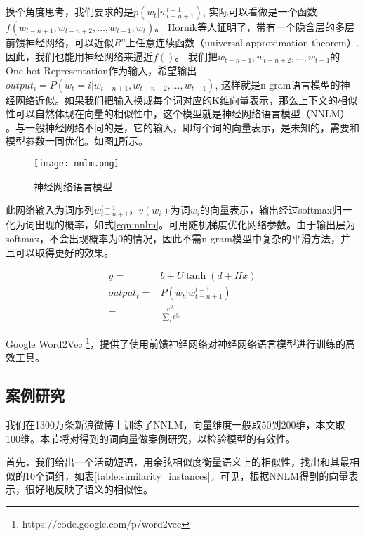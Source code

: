 换个角度思考，我们要求的是$p({w_t}|w_{t-n+1}^{t-1})$, 实际可以看做是一个函数$f(w_{t-n+1}, w_{t-n+2}, \ldots, w_{t-1}, w_t)$。 Hornik等人证明了，带有一个隐含层的多层前馈神经网络，可以近似$R^n$上任意连续函数（universal approximation theorem\cite{hornik1991approximation}）. 因此，我们也能用神经网络来逼近$f()$。 我们把$w_{t-n+1}, w_{t-n+2}, \ldots, w_{t-1}$的One-hot Representation作为输入，希望输出$output_i=P(w_t=i|w_{t-n+1}, w_{t-n+2}, \ldots, w_{t-1})$, 这样就是n-gram语言模型的神经网络近似。如果我们把输入换成每个词对应的K维向量表示，那么上下文的相似性可以自然体现在向量的相似性中，这个模型就是神经网络语言模型（NNLM）\cite{bengio2006neural} \cite{mikolov2013efficient}。与一般神经网络不同的是，它的输入，即每个词的向量表示，是未知的，需要和模型参数一同优化。如图\ref{fig:nnlm}所示。

\begin{figure}[htbp]
\centering
\texttt{[image: nnlm.png]}
\caption{神经网络语言模型}
\label{fig:nnlm}
\end{figure}

此网络输入为词序列$w_{t-n+1}^{t-1}$，$v(w_i)$为词$w_i$的向量表示，输出经过softmax归一化为词出现的概率，如式\ref{eqn:nnlm}。可用随机梯度优化网络参数。由于输出层为softmax，不会出现概率为0的情况，因此不需n-gram模型中复杂的平滑方法，并且可以取得更好的效果。


\begin{equation}
\begin{aligned}
y = & b+U\tanh(d+Hx)\\
output_t = & P(w_t|w_{t-n+1}^{t-1}) \\
		= & \frac{e^{y_i}}{\sum\nolimits_i {{e^{{y_i}}}} }
\end{aligned}		
\label{eqn:nnlm}
\end{equation}


Google Word2Vec \footnote{https://code.google.com/p/word2vec}，提供了使用前馈神经网络对神经网络语言模型进行训练的高效工具。

\subsection{案例研究}
\label{sec:case_study}
我们在1300万条新浪微博上训练了NNLM，向量维度一般取50到200维，本文取100维。本节将对得到的词向量做案例研究，以检验模型的有效性。

首先，我们给出一个活动短语，用余弦相似度衡量语义上的相似性，找出和其最相似的10个词组，如表\ref{table:similarity_instances}。可见，根据NNLM得到的向量表示，很好地反映了语义的相似性。

